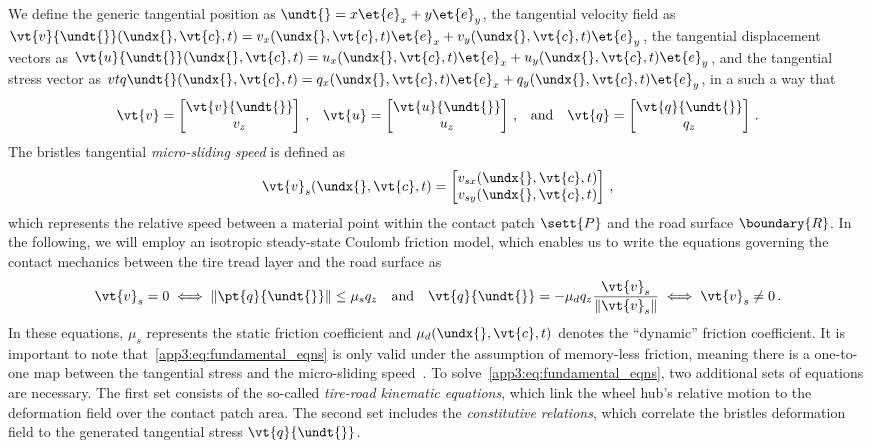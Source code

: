 We define the generic tangential position as $\undt{} = x\et{e}_x + y\et{e}_y$, the tangential velocity field as $\vt{v}{\undt{}}(\undx{}, \vt{c}, t) = v_x(\undx{}, \vt{c}, t)\et{e}_x + v_y(\undx{},\vt{c},t)\et{e}_y$, the tangential displacement vectors as $\vt{u}{\undt{}}(\undx{},\vt{c},t) = u_x(\undx{},\vt{c},t)\et{e}_x + u_y(\undx{},\vt{c},t)\et{e}_y$, and the tangential stress vector as $vt{q}{\undt{}}(\undx{},\vt{c},t) = q_x(\undx{},\vt{c},t)\et{e}_x + q_y(\undx{},\vt{c},t)\et{e}_y$, in a such a way that
%
\begin{equation}
  \vt{v} =
  \begin{bmatrix}
    \vt{v}{\undt{}} \\
    v_z
  \end{bmatrix} \, \text{,} \quad
  \vt{u} =
  \begin{bmatrix}
    \vt{u}{\undt{}} \\
    u_z
  \end{bmatrix} \, \text{,} \quad \text{and} \quad
  \vt{q} =
  \begin{bmatrix}
    \vt{q}{\undt{}} \\
    q_z
  \end{bmatrix} \, \text{.}
  \label{app3:eq:ut}
\end{equation}
%
The bristles tangential \emph{micro-sliding speed} is defined as
%
\begin{equation*}
  \vt{v}_s(\undx{},\vt{c},t) =
  \begin{bmatrix}
    v_{sx}(\undx{},\vt{c},t) \\
    v_{sy}(\undx{},\vt{c},t)
  \end{bmatrix} \, \text{,}
\end{equation*}
%
which represents the relative speed between a material point within the contact patch $\sett{P}$ and the road surface $\boundary{R}$. In the following, we will employ an isotropic steady-state Coulomb friction model, which enables us to write the equations governing the contact mechanics between the tire tread layer and the road surface as
%
\begin{equation}
  \vt{v}_s = 0 \iff \|\pt{q}{\undt{}}\| \leq \mu_s q_z
  \quad \text{and} \quad
  \vt{q}{\undt{}} = -\mu_d q_z \dfrac{\vt{v}_s}{\|\vt{v}_s\|}
  \iff \vt{v}_s \neq 0 \, \text{.}
  \label{app3:eq:fundamental_eqns}
\end{equation}
%
In these equations, $\mu_s$ represents the static friction coefficient and $\mu_d(\undx{}, \vt{c}, t)$ denotes the ``dynamic'' friction coefficient. It is important to note that~\eqref{app3:eq:fundamental_eqns} is only valid under the assumption of memory-less friction, meaning there is a one-to-one map between the tangential stress and the micro-sliding speed~\cite{canudasdewit2003dynamic}. To solve~\eqref{app3:eq:fundamental_eqns}, two additional sets of equations are necessary. The first set consists of the so-called \emph{tire-road kinematic equations}, which link the wheel hub's relative motion to the deformation field over the contact patch area. The second set includes the \emph{constitutive relations}, which correlate the bristles deformation field to the generated tangential stress $\vt{q}{\undt{}}$.


